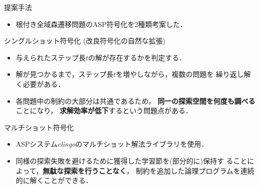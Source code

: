 \documentclass[dvipdfmx,11pt]{beamer}
\newcommand{\code}[1]{\lstinline[basicstyle=\ttfamily]{#1}}
\begin{document}
\begin{frame}{提案手法}
  \begin{itemize}
  \item 根付き全域森遷移問題のASP符号化を2種類考案した．
  \end{itemize}
  \begin{block}{シングルショット符号化 (改良符号化の自然な拡張)}
    \begin{itemize}
    \item 与えられたステップ長$t$の解が存在するかを判定する．
    \item 解が見つかるまで，ステップ長$t$を増やしながら，複数の問題を
      繰り返し解く必要がある．
    \item 各問題中の制約の大部分は共通であるため，
      \textbf{同一の探索空間を何度も調べる}ことになり，
      \textbf{求解効率が低下}するという問題点がある．
  \end{itemize}
 \end{block}
 \vfill
 \begin{alertblock}{マルチショット符号化}
   \begin{itemize}
   \item ASPシステム\textit{clingo}のマルチショット解法ライブラリを使用．
   \item 同様の探索失敗を避けるために獲得した学習節を(部分的に)保持す
     ることによって，\textbf{無駄な探索を行うことなく}，
     制約を追加した論理プログラムを連続的に解くことができる．
  \end{itemize}
 \end{alertblock}

\end{frame}
\end{document}
